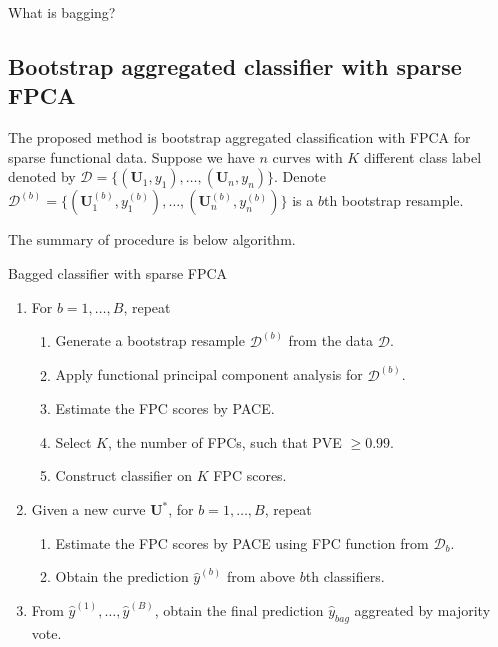 \documentclass[eng]{csam}
\def \bU { \mathbf{ U } }
\begin{document}
{\color{red}
	What is bagging?
}


\subsection{Bootstrap aggregated classifier with sparse FPCA}
The proposed method is bootstrap aggregated classification with FPCA for sparse functional data. 
Suppose we have $n$ curves with $K$ different class label denoted by $\mathcal{D} = \big\{(\bU_1, y_1), \dots, (\bU_n, y_n) \big\}$.
Denote $\mathcal{D}^{(b)} = \big\{(\bU^{(b)}_1, y^{(b)}_1), \dots, (\bU^{(b)}_n, y^{(b)}_n) \big\}$ is a $b$th bootstrap resample.

The summary of procedure is below algorithm.

\begin{algorithm}[H]
	\caption{Bagged classifier with sparse FPCA}
	\begin{enumerate}
		\item For $b = 1, \dots, B$, repeat
		\begin{enumerate}
			\item Generate a bootstrap resample $\mathcal{D}^{(b)}$ from the data $\mathcal{D}$.
			\item Apply functional principal component analysis for $\mathcal{D}^{(b)}$.
			\item Estimate the FPC scores by PACE.
			\item Select $K$, the number of FPCs, such that PVE $\ge 0.99$.
			\item Construct classifier on $K$ FPC scores.
		\end{enumerate}
		\item Given a new curve $\bU^*$, for $b = 1, \dots, B$, repeat
		\begin{enumerate}
			\item Estimate the FPC scores by PACE using FPC function from $\mathcal{D}_{b}$.
			\item Obtain the prediction $\hat y^{(b)}$ from above $b$th classifiers.
		\end{enumerate}
	
		\item From $\hat y^{(1)}, \dots, \hat y^{(B)}$, obtain the final prediction $\hat y_{bag}$ aggreated by majority vote.
	\end{enumerate}
\end{algorithm}
\end{document}
